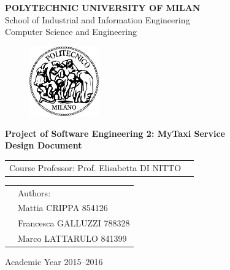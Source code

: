 \documentclass[a4paper, 12pt]{report}
\begin{document}
\begin{titlepage}

\begin{center}
\Large
\textbf{POLYTECHNIC UNIVERSITY OF MILAN} \\
\Large
School of Industrial and Information Engineering \\
Computer Science and Engineering
\end{center}

\addvspace{0.8cm}
\begin{figure}[h]
\begin{center}
\includegraphics[width=3cm]{cpt/img/polimi}
\end{center}
\end{figure}

\addvspace{0.1cm}
\begin{center}
\LARGE

\textbf{Project of Software Engineering 2: MyTaxi Service \\
Design Document}

\end{center}

\addvspace{0.5cm}
\Large
\begin{center}
\begin{tabular}{p{}p{}}
Course Professor: Prof. Elisabetta DI NITTO \\
\end{tabular}
\end{center}

\addvspace{0.6cm}
\Large
\begin{center}
\begin{tabular}{p{}p{}}
& Authors: \\
& Mattia 	CRIPPA		854126\\
& Francesca GALLUZZI	788328\\
& Marco 	LATTARULO	841399
\end{tabular}
\end{center}

\vfill
\Large
\begin{center}
Academic Year 2015--2016
\end{center}
\end{titlepage}
\end{document}
